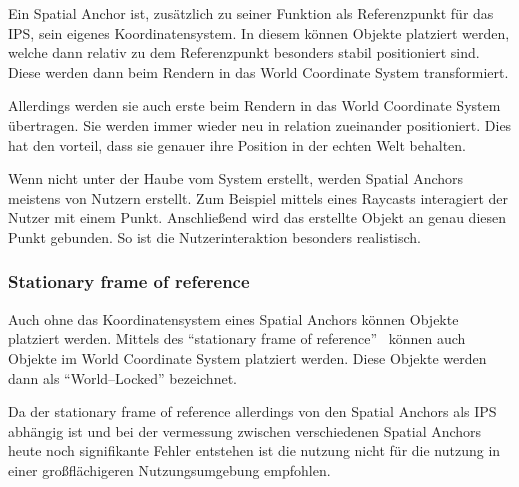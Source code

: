         Ein Spatial Anchor ist, zusätzlich zu seiner Funktion als Referenzpunkt für das IPS, sein eigenes Koordinatensystem.
        In diesem können Objekte platziert werden, welche dann relativ zu dem Referenzpunkt besonders stabil positioniert sind.
        Diese werden dann beim Rendern in das World Coordinate System transformiert.

        Allerdings werden sie auch erste beim Rendern in das World Coordinate System übertragen.
        Sie werden immer wieder neu in relation zueinander positioniert.
        Dies hat den vorteil, dass sie genauer ihre Position in der echten Welt behalten.

        Wenn nicht unter der Haube vom System erstellt, werden Spatial Anchors meistens von Nutzern erstellt.
        Zum Beispiel mittels eines Raycasts interagiert der Nutzer mit einem Punkt.
        Anschließend wird das erstellte Objekt an genau diesen Punkt gebunden.
        So ist die Nutzerinteraktion besonders realistisch.

    \subsubsection{Stationary frame of reference}\label{subsubsec:stationary-frame-of-reference}
        Auch ohne das Koordinatensystem eines Spatial Anchors können Objekte platziert werden.
        Mittels des \enquote{stationary frame of reference}~\autocite{thetuvix-2023A} können auch Objekte im World Coordinate System platziert werden.
        Diese Objekte werden dann als \enquote{World--Locked} bezeichnet.

        Da der stationary frame of reference allerdings von den Spatial Anchors als IPS abhängig ist und bei der vermessung zwischen verschiedenen Spatial Anchors heute noch signifikante Fehler entstehen ist die nutzung nicht für die nutzung in einer großflächigeren Nutzungsumgebung empfohlen.
        
